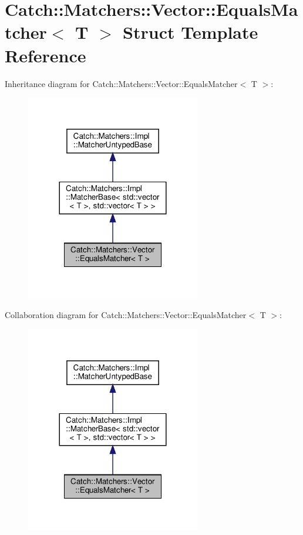 \hypertarget{structCatch_1_1Matchers_1_1Vector_1_1EqualsMatcher}{}\section{Catch\+:\+:Matchers\+:\+:Vector\+:\+:Equals\+Matcher$<$ T $>$ Struct Template Reference}
\label{structCatch_1_1Matchers_1_1Vector_1_1EqualsMatcher}


Inheritance diagram for Catch\+:\+:Matchers\+:\+:Vector\+:\+:Equals\+Matcher$<$ T $>$\+:\nopagebreak
\begin{figure}[H]
\begin{center}
\leavevmode
\includegraphics[width=216pt]{structCatch_1_1Matchers_1_1Vector_1_1EqualsMatcher__inherit__graph}
\end{center}
\end{figure}


Collaboration diagram for Catch\+:\+:Matchers\+:\+:Vector\+:\+:Equals\+Matcher$<$ T $>$\+:\nopagebreak
\begin{figure}[H]
\begin{center}
\leavevmode
\includegraphics[width=216pt]{structCatch_1_1Matchers_1_1Vector_1_1EqualsMatcher__coll__graph}
\end{center}
\end{figure}
